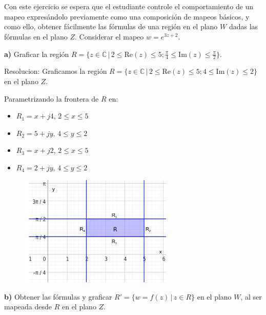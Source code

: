 \documentclass[12pt]{report}
\begin{document}
\clearpage

\chapter{}

Con este ejercicio se espera que el estudiante controle el comportamiento de un mapeo expresándolo previamente como una composición de mapeos básicos, y como ello, obtener fácilmente las fórmulas de una región en el plano $W$ dadas las fórmulas en el plano $Z$. Considerar el mapeo $w = e^{3z + 2}$.

\textbf{a)} Graficar la región $R = \{z \in \mathbb{C} \, | \, 2 \leq \text{Re}(z) \leq 5; \frac{\pi}{4} \leq \text{Im}(z) \leq \frac{\pi}{2}\}$.

Resolucion:
Graficamos la región $R = \{z \in \mathbb{C} \, | \, 2 \leq \text{Re}(z) \leq 5; 4 \leq \text{Im}(z) \leq 2\}$ en el plano $Z$.

Parametrizando la frontera de $R$ en:
\begin{itemize}
    \item $R_1 = x + j4$, $2 \leq x \leq 5$
    \item $R_2 = 5 + jy$, $4 \leq y \leq 2$
    \item $R_3 = x + j2$, $2 \leq x \leq 5$
    \item $R_4 = 2 + jy$, $4 \leq y \leq 2$
\end{itemize}


\begin{figure}[h] %
    \centering %
    \includegraphics[width=0.65\textwidth]{./Imagenes/foto1Ej4.png} %
\end{figure}

\textbf{b)} Obtener las fórmulas y graficar $R' = \{w = f(z) \, | \, z \in R\}$ en el plano $W$, al ser mapeada desde $R$ en el plano $Z$.
\end{document}
